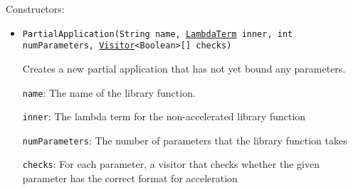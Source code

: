 Constructors:
\begin{itemize}
\item \texttt{PartialApplication(String name, \hyperref[type:edu.kit.wavelength.client.model.term.LambdaTerm]{LambdaTerm} inner, int numParameters, \hyperref[type:edu.kit.wavelength.client.model.term.Visitor]{Visitor}<Boolean>[] checks)}

Creates a new partial application that has not yet bound any parameters.

\texttt{name}: The name of the library function.

\texttt{inner}: The lambda term for the non-accelerated library function

\texttt{numParameters}: The number of parameters that the library function takes

\texttt{checks}: For each parameter, a visitor that checks whether the given parameter
 has the correct format for acceleration

\end{itemize}

